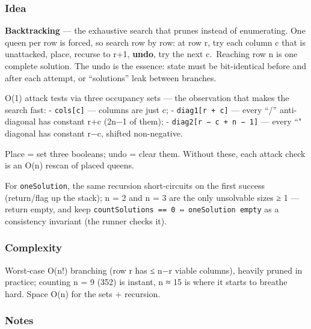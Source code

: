 \documentclass[
  10pt,
  letterpaper,
  onecolumn]{article}
\begin{document}
\hypertarget{idea-19}{%
\subsubsection{Idea}\label{idea-19}}

\textbf{Backtracking} --- the exhaustive search that prunes instead of
enumerating. One queen per row is forced, so search row by row: at row
r, try each column c that is unattacked, place, recurse to r+1,
\textbf{undo}, try the next c.~Reaching row n is one complete solution.
The undo is the essence: state must be bit-identical before and after
each attempt, or ``solutions'' leak between branches.

O(1) attack tests via three occupancy sets --- the observation that
makes the search fast: - \texttt{cols{[}c{]}} --- columns are just c; -
\texttt{diag1{[}r\ +\ c{]}} --- every ``/'' anti-diagonal has constant
r+c (2n−1 of them); - \texttt{diag2{[}r\ −\ c\ +\ n\ −\ 1{]}} --- every
``" diagonal has constant r−c, shifted non-negative.

Place = set three booleans; undo = clear them. Without these, each
attack check is an O(n) rescan of placed queens.

For \texttt{oneSolution}, the same recursion short-circuits on the first
success (return/flag up the stack); n = 2 and n = 3 are the only
unsolvable sizes ≥ 1 --- return empty, and keep
\texttt{countSolutions\ ==\ 0\ ⇔\ oneSolution\ empty} as a consistency
invariant (the runner checks it).

\hypertarget{complexity-19}{%
\subsubsection{Complexity}\label{complexity-19}}

Worst-case O(n!) branching (row r has ≤ n−r viable columns), heavily
pruned in practice; counting n = 9 (352) is instant, n ≈ 15 is where it
starts to breathe hard. Space O(n) for the sets + recursion.

\hypertarget{notes-17}{%
\subsubsection{Notes}\label{notes-17}}
\end{document}
